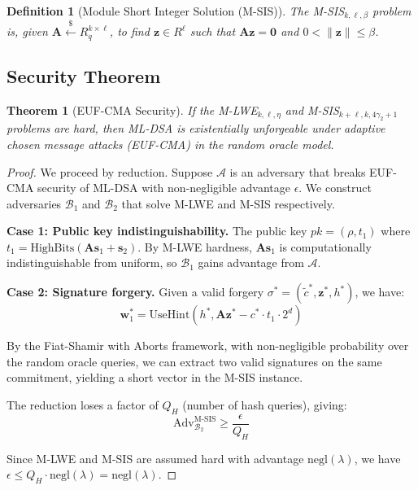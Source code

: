 \documentclass[11pt,a4paper]{article}
\newtheorem{theorem}{Theorem}
\newtheorem{definition}{Definition}
\begin{document}
\begin{definition}[Module Short Integer Solution (M-SIS)]
The M-SIS$_{k,\ell,\beta}$ problem is, given $\mathbf{A} \xleftarrow{\$} R_q^{k \times \ell}$, to find $\mathbf{z} \in R^{\ell}$ such that $\mathbf{A}\mathbf{z} = \mathbf{0}$ and $0 < \|\mathbf{z}\| \leq \beta$.
\end{definition}

\subsection{Security Theorem}

\begin{theorem}[EUF-CMA Security]
\label{thm:security}
If the M-LWE$_{k,\ell,\eta}$ and M-SIS$_{k+\ell,k,4\gamma_2+1}$ problems are hard, then ML-DSA is existentially unforgeable under adaptive chosen message attacks (EUF-CMA) in the random oracle model.
\end{theorem}

\begin{proof}
We proceed by reduction. Suppose $\mathcal{A}$ is an adversary that breaks EUF-CMA security of ML-DSA with non-negligible advantage $\epsilon$. We construct adversaries $\mathcal{B}_1$ and $\mathcal{B}_2$ that solve M-LWE and M-SIS respectively.

\textbf{Case 1: Public key indistinguishability.} The public key $pk = (\rho, t_1)$ where $t_1 = \text{HighBits}(\mathbf{A}\mathbf{s}_1 + \mathbf{s}_2)$. By M-LWE hardness, $\mathbf{A}\mathbf{s}_1$ is computationally indistinguishable from uniform, so $\mathcal{B}_1$ gains advantage from $\mathcal{A}$.

\textbf{Case 2: Signature forgery.} Given a valid forgery $\sigma^* = (\tilde{c}^*, \mathbf{z}^*, h^*)$, we have:
\[
\mathbf{w}_1^* = \text{UseHint}(h^*, \mathbf{A}\mathbf{z}^* - c^* \cdot t_1 \cdot 2^d)
\]

By the Fiat-Shamir with Aborts framework, with non-negligible probability over the random oracle queries, we can extract two valid signatures on the same commitment, yielding a short vector in the M-SIS instance.

The reduction loses a factor of $Q_H$ (number of hash queries), giving:
\[
\text{Adv}^{\text{M-SIS}}_{\mathcal{B}_2} \geq \frac{\epsilon}{Q_H}
\]

Since M-LWE and M-SIS are assumed hard with advantage $\text{negl}(\lambda)$, we have $\epsilon \leq Q_H \cdot \text{negl}(\lambda) = \text{negl}(\lambda)$.
\end{proof}
\end{document}
